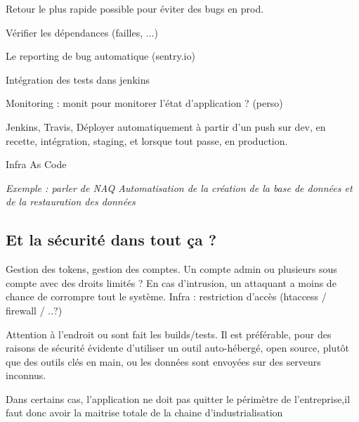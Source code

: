 
Retour le plus rapide possible pour éviter des bugs en prod. 

Vérifier les dépendances (failles, ...)

Le reporting de bug automatique (sentry.io)

Intégration des tests dans jenkins

Monitoring : monit pour monitorer l'état d'application ? (perso)

Jenkins, Travis, Déployer automatiquement à partir d'un push sur dev, en recette, intégration, staging, et lorsque tout passe, en production.

Infra As Code

\textit{Exemple : parler de NAQ Automatisation de la création de la base de données et de la restauration des données}

\subsection{Et la sécurité dans tout ça ?}


Gestion des tokens, gestion des comptes.
Un compte admin ou plusieurs sous compte avec des droits limités ? En cas d'intrusion, un attaquant a moins de chance de corrompre tout le système.
Infra : restriction d'accès (htaccess / firewall / ..?)

Attention à l'endroit ou sont fait les builds/tests. Il est préférable, pour des raisons de sécurité évidente d'utiliser un outil auto-hébergé, open source, plutôt que des outils clés en main, ou les données sont envoyées sur des serveurs inconnus. 

Dans certains cas, l'application ne doit pas quitter le périmètre de l'entreprise,il faut donc avoir la maitrise totale de la chaine d'industrialisation
